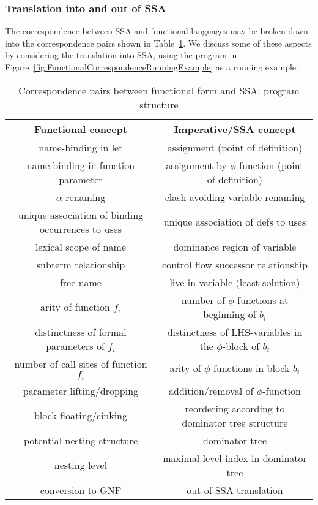 \subsubsection{Translation into and out of SSA}

The correspondence between SSA and functional languages may be broken
down into the correspondence pairs shown in
Table~\ref{tableFunctionalCorrespondencesI}. We discuss some of these
aspects by considering the translation into SSA, using the program in
Figure~\ref{fig:FunctionalCorrespondenceRunningExample} as a running
example.

\begin{table}
\begin{tabular}{|c|c|}
  \hline Functional concept & Imperative/SSA concept\\ 
  \hline \hline
  name-binding in let & assignment (point of definition)\\
  name-binding in function parameter & assignment by $\phi$-function
  (point of definition)\\ 
  $\alpha$-renaming & clash-avoiding variable renaming\\
  unique association of binding occurrences to uses & unique
  association of defs to uses\\ 
  lexical scope of name & dominance
  region of variable\\ 
  subterm relationship & control flow successor relationship\\
  free name & live-in variable (least
  solution)\\ 
  arity of function $f_i$ & number of
  $\phi$-functions at beginning of $b_i$\\ 
  distinctness of formal
  parameters of $f_i$ & distinctness of LHS-variables in the
  $\phi$-block of $b_i$\\ 
  number of call sites of function $f_i$ &
  arity of $\phi$-functions in block $b_i$\\ 
  parameter lifting/dropping & addition/removal of $\phi$-function\\ 
  block floating/sinking & reordering according to dominator tree
  structure\\
  potential nesting structure 
  & dominator tree\\
  nesting level & maximal
  level index in dominator tree\\
  conversion to GNF & out-of-SSA translation\\
  \hline
\end{tabular}
\caption{\label{tableFunctionalCorrespondencesI}
  Correspondence pairs between functional form and SSA: program structure}
\end{table}

